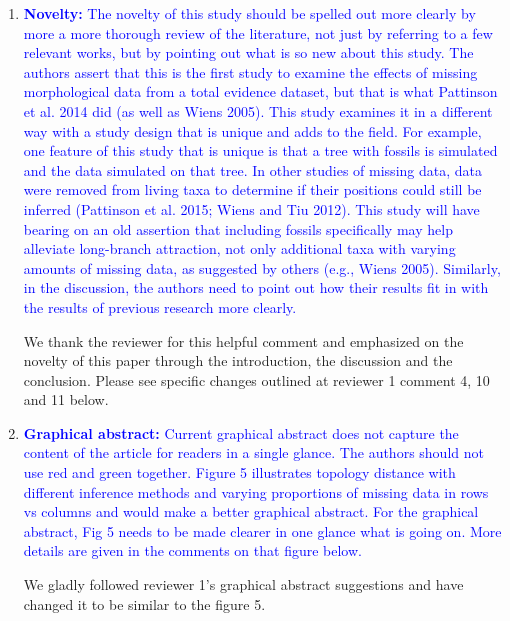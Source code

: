\documentclass[12pt,letterpaper]{article}
\begin{document}
\begin{enumerate}
\item{\textcolor{blue}{\textbf{Novelty:} The novelty of this study should be spelled out more clearly by more a more thorough review of the literature, not just by referring to a few relevant works, but by pointing out what is so new about this study.
The authors assert that this is the first study to examine the effects of missing morphological data from a total evidence dataset, but that is what Pattinson et al. 2014 did (as well as Wiens 2005).
This study examines it in a different way with a study design that is unique and adds to the field. For example, one feature of this study that is unique is that a tree with fossils is simulated and the data simulated on that tree.
In other studies of missing data, data were removed from living taxa to determine if their positions could still be inferred (Pattinson et al. 2015; Wiens and Tiu 2012).
This study will have bearing on an old assertion that including fossils specifically may help alleviate long-branch attraction, not only additional taxa with varying amounts of missing data, as suggested by others (e.g., Wiens 2005).
Similarly, in the discussion, the authors need to point out how their results fit in with the results of previous research more clearly. }}

We thank the reviewer for this helpful comment and emphasized on the novelty of this paper through the introduction, the discussion and the conclusion.
Please see specific changes outlined at reviewer 1 comment 4, 10 and 11 below.

\item{\textcolor{blue}{\textbf{Graphical abstract:} Current graphical abstract does not capture the content of the article for readers in a single glance.
The authors should not use red and green together.
Figure 5 illustrates topology distance with different inference methods and varying proportions of missing data in rows vs columns and would make a better graphical abstract.
For the graphical abstract, Fig 5 needs to be made clearer in one glance what is going on.
More details are given in the comments on that figure below.}}

We gladly followed reviewer 1's graphical abstract suggestions and have changed it to be similar to the figure 5. %


\end{enumerate}
\end{document}
